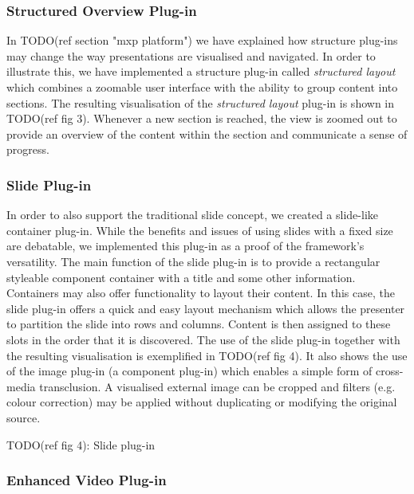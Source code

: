 \documentclass[a4paper,12pt]{report}
\begin{document}
    \subsubsection{Structured Overview Plug-in}

     In TODO(ref section "mxp platform") we have explained how structure
     plug-ins may change the way presentations are visualised and navigated. In
     order to illustrate this, we have implemented a structure plug-in called
     \emph{structured layout} which combines a zoomable user interface with the
     ability to group content into sections. The resulting visualisation of the
     \emph{structured layout} plug-in is shown in TODO(ref fig 3). Whenever a
     new section is reached, the view is zoomed out to provide an overview of
     the content within the section and communicate a sense of progress.

    \subsubsection{Slide Plug-in}

     In order to also support the traditional slide concept, we created a
     slide-like container plug-in. While the benefits and issues of using
     slides with a fixed size are debatable, we implemented this plug-in as a
     proof of the framework's versatility. The main function of the slide
     plug-in is to provide a rectangular styleable component container with a
     title and some other information. Containers may also offer functionality
     to layout their content. In this case, the slide plug-in offers a quick
     and easy layout mechanism which allows the presenter to partition the
     slide into rows and columns. Content is then assigned to these slots in
     the order that it is discovered. The use of the slide plug-in together
     with the resulting visualisation is exemplified in TODO(ref fig 4). It
     also shows the use of the image plug-in (a component plug-in) which
     enables a simple form of cross-media transclusion. A visualised external
     image can be cropped and filters (e.g. colour correction) may be applied
     without duplicating or modifying the original source.

     TODO(ref fig 4): Slide plug-in

    \subsubsection{Enhanced Video Plug-in}
\end{document}
